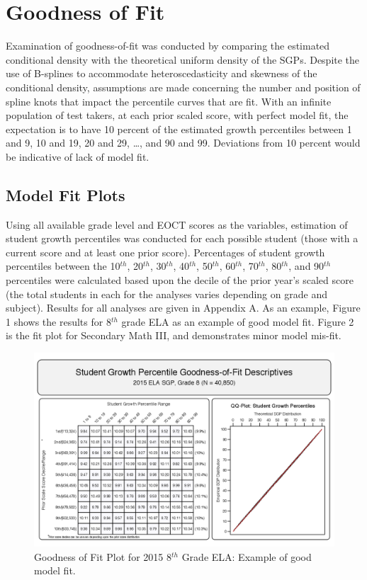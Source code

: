 \documentclass[12pt]{article}
\begin{document}
\pagebreak

\section{Goodness of Fit}\label{goodness-of-fit}

Examination of goodness-of-fit was conducted by comparing the estimated
conditional density with the theoretical uniform density of the SGPs.
Despite the use of B-splines to accommodate heteroscedasticity and
skewness of the conditional density, assumptions are made concerning the
number and position of spline knots that impact the percentile curves
that are fit. With an infinite population of test takers, at each prior
scaled score, with perfect model fit, the expectation is to have 10
percent of the estimated growth percentiles between 1 and 9, 10 and 19,
20 and 29, \ldots{}, and 90 and 99. Deviations from 10 percent would be
indicative of lack of model fit.

\subsection{Model Fit Plots}\label{model-fit-plots}

Using all available grade level and EOCT scores as the variables,
estimation of student growth percentiles was conducted for each possible
student (those with a current score and at least one prior score).
Percentages of student growth percentiles between the 10\(^{th}\),
20\(^{th}\), 30\(^{th}\), 40\(^{th}\), 50\(^{th}\), 60\(^{th}\),
70\(^{th}\), 80\(^{th}\), and 90\(^{th}\) percentiles were calculated
based upon the decile of the prior year's scaled score (the total
students in each for the analyses varies depending on grade and
subject). Results for all analyses are given in Appendix A. As an
example, Figure 1 shows the results for 8\(^{th}\) grade ELA as an
example of good model fit. Figure 2 is the fit plot for Secondary Math
III, and demonstrates minor model mis-fit.

\begin{figure}[htbp]
\centering
\includegraphics{../img/Goodness_of_Fit/ELA.2015/gofSGP_Grade_8.png}
\caption{Goodness of Fit Plot for 2015 8\(^{th}\) Grade ELA: Example of
good model fit.}
\end{figure}
\end{document}
